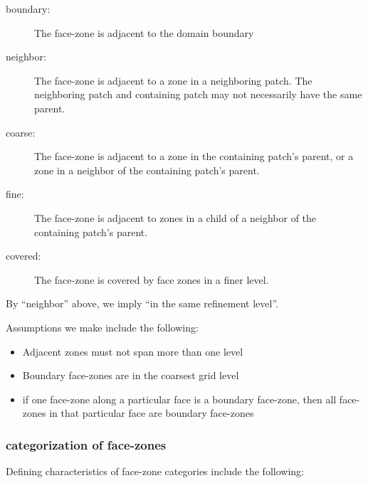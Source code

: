 \documentclass[10pt]{article}
\begin{document}
\begin{description}
\item[boundary: ] The face-zone is adjacent to the domain boundary
\item[neighbor: ] The face-zone is adjacent to a zone in a neighboring patch.  The neighboring patch and containing patch may not necessarily have the same parent.
\item[coarse: ] The face-zone is adjacent to a zone in the containing patch's parent, or
a zone in a neighbor of the containing patch's parent.
\item[fine: ] The face-zone is adjacent to zones in a child of a neighbor of the containing patch's parent.
\item[covered: ] The face-zone is covered by face zones in a finer level.
\end{description}

By ``neighbor'' above, we imply ``in the same refinement level''.

Assumptions we make include the following:

\begin{itemize}
\item Adjacent zones must not span more than one level
\item Boundary face-zones are in the coarsest grid level
\item if one face-zone along a particular face is a boundary face-zone, then
all face-zones in that particular face are boundary face-zones
\end{itemize}

\subsubsection{categorization of face-zones}

Defining characteristics of face-zone categories include the following:
\end{document}
